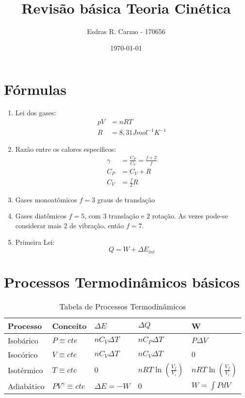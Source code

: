 \documentclass{article}
\author{Esdras R. Carmo - 170656}
\title{Revisão básica Teoria Cinética}
\date{\today}
\begin{document}
    \maketitle

    \section{Fórmulas}
        \begin{enumerate}
        \item
            Lei dos gases:
            \begin{align*}
                p V &= nRT\\
                R &= 8,31 Jmol^{-1}K^{-1}
            \end{align*}

        \item
            Razão entre os calores específicos:
            \begin{align*}
                \gamma &= \frac{C_P}{C_V} = \frac{f + 2}{f}\\
                C_P &= C_V + R\\
                C_V &= \frac{f}{2} R
            \end{align*}

        \item
            Gases monoatômicos $f = 3$ graus de translação
        \item
            Gases diatômicos $f = 5$, com $3$ translação e $2$ rotação. As vezes pode-se
            considerar mais $2$ de vibração, então $f = 7$.
        \item
            Primeira Lei:
            \[
                Q = W + \Delta E_{int}
            \]
        \end{enumerate}

    \section{Processos Termodinâmicos básicos}
        \begin{table}[h!]
            \centering
            \caption{Tabela de Processos Termodinâmicos}

            \begin{tabular}{|l|l|l|l|l|}
                \hline
                Processo & Conceito & $\Delta E$ & $\Delta Q$ & W \\
                \hline
                Isobárico & $P \equiv cte$ & $n C_V \Delta T$ & $n C_P \Delta T$ & $P \Delta V$\\
                \hline
                Isocórico & $V \equiv cte$ & $n C_V \Delta T$ & $n C_V \Delta T$ & $0$ \\
                \hline
                Isotérmico & $T \equiv cte$ & $0$ & $n R T \ln \left( \frac{V_f}{V_i} \right)$ & $ n R T \ln \left( \frac{V_f}{V_i} \right)$ \\
                \hline
                Adiabático & $PV^\gamma \equiv cte$ & $\Delta E = -W$ & $0$ & $W = \int P dV$\\
                \hline
            \end{tabular}
        \end{table}
\end{document}
